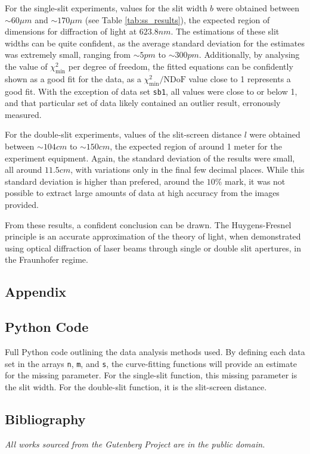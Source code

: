 \documentclass[a4paper]{article}
\begin{document}
For the single-slit experiments, values for the slit width $b$ were obtained between $\sim60 \mu m$ and $\sim170\mu m$ (see Table \ref{tab:ss_results}), the expected region of dimensions for diffraction of light at $623.8nm$. The estimations of these slit widths can be quite confident, as the average standard deviation for the estimates was extremely small, ranging from $\sim 5pm$ to $\sim300pm$. Additionally, by analysing the value of $\chi^2_{\text{min}}$ per degree of freedom, the fitted equations can be confidently shown as a good fit for the data, as a $\chi^2_{\text{min}}/\text{NDoF}$ value close to 1 represents a good fit. With the exception of data set \lstinline$sb1$, all values were close to or below 1, and that particular set of data likely contained an outlier result, erronously measured. 

For the double-slit experiments, values of the slit-screen distance $l$ were obtained between $\sim104cm$ to $\sim150cm$, the expected region of around 1 meter for the experiment equipment. Again, the standard deviation of the results were small, all around $11.5cm$, with variations only in the final few decimal places. While this standard deviation is higher than prefered, around the $10\%$ mark, it was not possible to extract large amounts of data at high accuracy from the images provided.

From these results, a confident conclusion can be drawn. The Huygens-Fresnel principle is an accurate approximation of the theory of light, when demonstrated using optical diffraction of laser beams through single or double slit apertures, in the Fraunhofer regime.

\newpage
\begin{appendix}
\section{Appendix}
\subsection{Python Code}\label{sec:python}

Full Python code outlining the data analysis methods used. By defining each data set in the arrays \lstinline$n$, \lstinline$m$, and \lstinline$s$, the curve-fitting functions will provide an estimate for the missing parameter. For the single-slit function, this missing parameter is the slit width. For the double-slit function, it is the slit-screen distance. 
\clearpage
\subsection{Bibliography}
\emph{All works sourced from the Gutenberg Project are in the public domain.}


\end{appendix}
\end{document}
